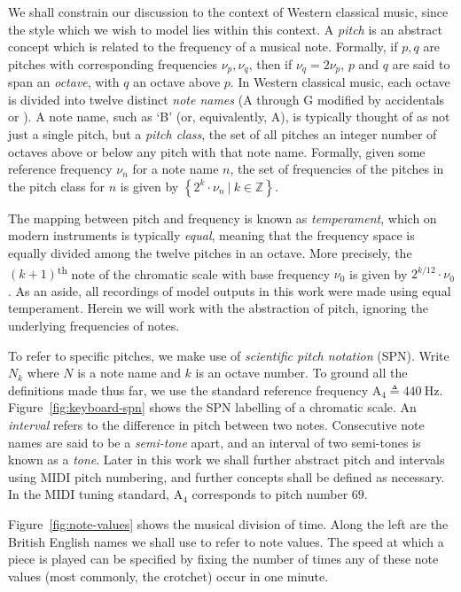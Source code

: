 \documentclass[12pt,a4paper,twoside,openright]{report}
\newcommand{\set}[1]{ \left\{ #1 \right\} }
\newcommand{\insharp}[0]{\sharp[raise=0.1,scale=0.8]}
\newcommand{\inflat}[0]{\flat[raise=0.1,scale=0.8]}
\begin{document}
We shall constrain our discussion to the context of Western classical music,
since the style which we wish to model lies within this context. A \emph{pitch}
is an abstract concept which is related to the frequency of a musical note.
Formally, if $p,q$ are pitches with corresponding frequencies $\nu_p,\nu_q$,
then if $\nu_q = 2\nu_p$, $p$ and $q$ are said to span an \emph{octave}, with
$q$ an octave above $p$. In Western classical music, each octave is divided into
twelve distinct \emph{note names} (A through G modified by accidentals
\insharp{} or \inflat{}). A note name, such as `B\inflat' (or, equivalently,
A\insharp), is typically thought of as not just a single pitch, but a
\emph{pitch class}, the set of all pitches an integer number of octaves above or
below any pitch with that note name.  Formally, given some reference frequency
$\nu_n$ for a note name $n$, the set of frequencies of the pitches in the pitch
class for $n$ is given by $\set{ 2^k \cdot \nu_n\ |\ k \in \mathbb{Z} }.$

The mapping between pitch and frequency is known as \emph{temperament}, which on
modern instruments is typically \emph{equal}, meaning that the frequency space is
equally divided among the twelve pitches in an octave. More precisely, the
$(k+1)$\textsuperscript{th} note of the chromatic scale with base frequency $\nu_0$ is
given by $2^{k/12}\cdot\nu_0$. As an aside, all recordings of
model outputs in this work were made using equal temperament. Herein
we will work with the abstraction of pitch, ignoring the underlying frequencies
of notes.

To refer to specific pitches, we make use of \emph{scientific pitch notation}
(SPN). Write $N_k$ where $N$ is a note name and $k$ is an octave number. To
ground all the definitions made thus far, we use the standard reference
frequency $\mathrm{A}_4 \triangleq 440\ \mathrm{Hz}$.
Figure~\ref{fig:keyboard-spn} shows the SPN labelling of a chromatic scale. An
\emph{interval} refers to the difference in pitch between two notes. Consecutive
note names are said to be a \emph{semi-tone} apart, and an interval of two
semi-tones is known as a \emph{tone}. Later in this work we shall further
abstract pitch and intervals using MIDI pitch numbering, and further concepts
shall be defined as necessary. In the MIDI tuning standard, $\mathrm{A}_4$
corresponds to pitch number $69$.

Figure~\ref{fig:note-values} shows the musical division of time. Along the left
are the British English names we shall use to refer to note values. The speed at
which a piece is played can be specified by fixing the number of times any of these
note values (most commonly, the crotchet) occur in one minute.
\end{document}
